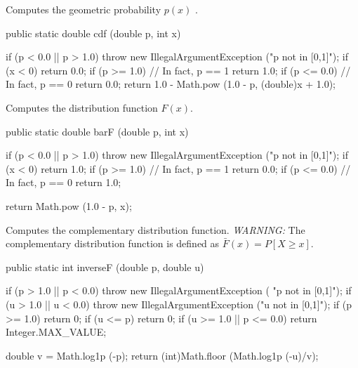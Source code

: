  \begin{tabb}
   Computes the geometric probability $p(x)$%
.
 \end{tabb}
\begin{code}

   public static double cdf (double p, int x)\begin{hide} {
      if (p < 0.0 || p > 1.0)
        throw new IllegalArgumentException ("p not in [0,1]");
      if (x < 0)
         return 0.0;
      if (p >= 1.0)                  // In fact, p == 1
         return 1.0;
      if (p <= 0.0)                  // In fact, p == 0
         return 0.0;
      return 1.0 - Math.pow (1.0 - p, (double)x + 1.0);
   }\end{hide}
\end{code}
  \begin{tabb} Computes the distribution function $F(x)$.
  \end{tabb}
\begin{code}

   public static double barF (double p, int x)\begin{hide} {
      if (p < 0.0 || p > 1.0)
         throw new IllegalArgumentException ("p not in [0,1]");
      if (x < 0)
         return 1.0;
      if (p >= 1.0)                  // In fact, p == 1
         return 0.0;
      if (p <= 0.0)                  // In fact, p == 0
         return 1.0;

      return Math.pow (1.0 - p, x);
   }\end{hide}
\end{code}
\begin{tabb} Computes the complementary distribution function.
\emph{WARNING:} The complementary distribution function is defined as
$\bar F(x) = P[X \ge x]$.
\end{tabb}
\begin{code}

   public static int inverseF (double p, double u)\begin{hide} {
        if (p > 1.0 || p < 0.0)
            throw new IllegalArgumentException ( "p not in [0,1]");
        if (u > 1.0 || u < 0.0)
            throw new IllegalArgumentException ("u not in [0,1]");
        if (p >= 1.0)
            return 0;
        if (u <= p)
           return 0;
        if (u >= 1.0 || p <= 0.0)
            return Integer.MAX_VALUE;

         double v = Math.log1p (-p);
         return (int)Math.floor (Math.log1p (-u)/v);
   }\end{hide}
\end{code}
